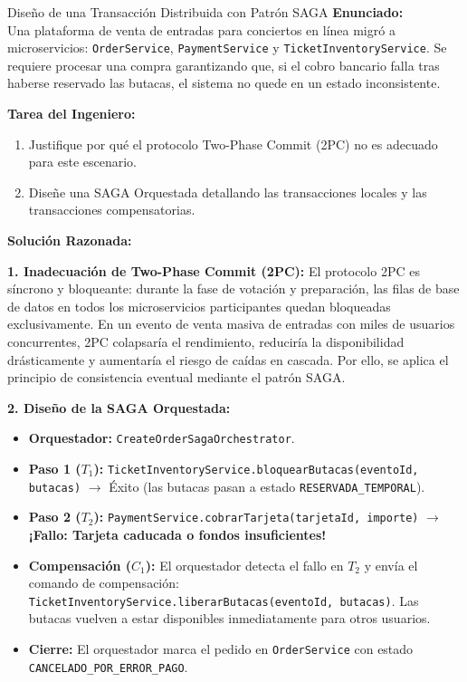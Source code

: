 \begin{ejercicioresuelto}{Diseño de una Transacción Distribuida con Patrón SAGA}
\textbf{Enunciado:}\\
Una plataforma de venta de entradas para conciertos en línea migró a microservicios: \texttt{OrderService}, \texttt{PaymentService} y \texttt{TicketInventoryService}. Se requiere procesar una compra garantizando que, si el cobro bancario falla tras haberse reservado las butacas, el sistema no quede en un estado inconsistente.

\textbf{Tarea del Ingeniero:}\\
\begin{enumerate}
  \item Justifique por qué el protocolo Two-Phase Commit (2PC) no es adecuado para este escenario.
  \item Diseñe una SAGA Orquestada detallando las transacciones locales y las transacciones compensatorias.
\end{enumerate}

\vspace{0.5em}
\textbf{Solución Razonada:}

\textbf{1. Inadecuación de Two-Phase Commit (2PC):}
El protocolo 2PC es síncrono y bloqueante: durante la fase de votación y preparación, las filas de base de datos en todos los microservicios participantes quedan bloqueadas exclusivamente. En un evento de venta masiva de entradas con miles de usuarios concurrentes, 2PC colapsaría el rendimiento, reduciría la disponibilidad drásticamente y aumentaría el riesgo de caídas en cascada. Por ello, se aplica el principio de consistencia eventual mediante el patrón SAGA.

\textbf{2. Diseño de la SAGA Orquestada:}
\begin{itemize}[leftmargin=1.5em]
  \item \textbf{Orquestador:} \texttt{CreateOrderSagaOrchestrator}.
  \item \textbf{Paso 1 ($T_1$):} \texttt{TicketInventoryService.bloquearButacas(eventoId, butacas)} $\to$ Éxito (las butacas pasan a estado \texttt{RESERVADA\_TEMPORAL}).
  \item \textbf{Paso 2 ($T_2$):} \texttt{PaymentService.cobrarTarjeta(tarjetaId, importe)} $\to$ \textcolor{alertred}{\textbf{¡Fallo: Tarjeta caducada o fondos insuficientes!}}
  \item \textbf{Compensación ($C_1$):} El orquestador detecta el fallo en $T_2$ y envía el comando de compensación: \texttt{TicketInventoryService.liberarButacas(eventoId, butacas)}. Las butacas vuelven a estar disponibles inmediatamente para otros usuarios.
  \item \textbf{Cierre:} El orquestador marca el pedido en \texttt{OrderService} con estado \texttt{CANCELADO\_POR\_ERROR\_PAGO}.
\end{itemize}
\end{ejercicioresuelto}

